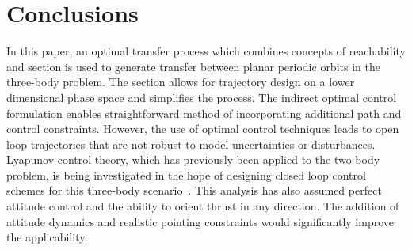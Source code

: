 \documentclass[preprint]{elsarticle}
\begin{document}
\section{Conclusions}\label{sec:conclusion}
In this paper, an optimal transfer process which combines concepts of reachability and \Poincare section is used to generate transfer between planar periodic orbits in the three-body problem.
The \Poincare section allows for trajectory design on a lower dimensional phase space and simplifies the process.
The indirect optimal control formulation enables straightforward method of incorporating additional path and control constraints.
However, the use of optimal control techniques leads to open loop trajectories that are not robust to model uncertainties or disturbances.
Lyapunov control theory, which has previously been applied to the two-body problem, is being investigated in the hope of designing closed loop control schemes for this three-body scenario~\cite{chang2002}.
This analysis has also assumed perfect attitude control and the ability to orient thrust in any direction.
The addition of attitude dynamics and realistic pointing constraints would significantly improve the applicability.

\appendix
\end{document}
